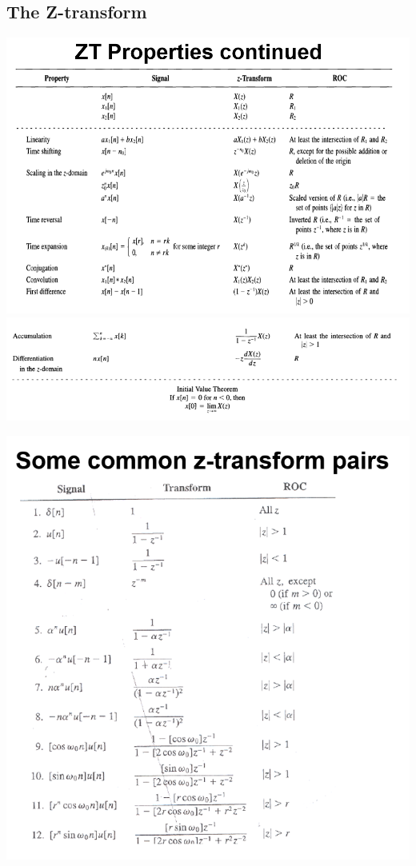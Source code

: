 \documentclass[landscape,a4paper]{article}
\begin{document}
\newpage
\begin{multicols}{2}
\section{The Z-transform}
\includegraphics[width=\linewidth]{p4.png}
\includegraphics[width=\linewidth]{p5.png}

\includegraphics[width=\linewidth]{p6.png}
\end{multicols}
\end{document}
